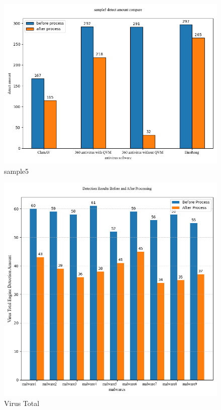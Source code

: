 \begin{figure}[htbp]
  \includegraphics[scale=0.60]{images/sample5.png}
  \caption{sample5}\label{fig:sample5}
\end{figure}
\begin{figure}[htbp]
  \centering
  \includegraphics[scale=0.60]{images/Virus_Total.png}
  \caption{Virus Total}\label{fig:Virus_Total}
\end{figure}
